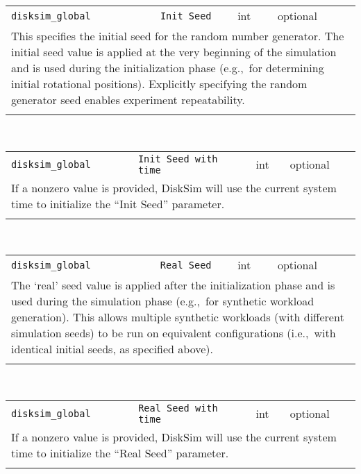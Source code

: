 \noindent 
\begin{tabular}{|p{\lpmodwidth}|p{\lpnamewidth}|p{0.5in}|p{0.5in}|}
\cline{1-4}
\texttt{disksim\_global} & \texttt{Init Seed} & int & optional \\ 
\cline{1-4}
\multicolumn{4}{|p{6in}|}{
This specifies the initial seed for the random number generator.
The initial seed value is applied at the very beginning of the
simulation and is used during the initialization phase (e.g.,~for
determining initial rotational positions). Explicitly specifying the
random generator seed enables experiment repeatability.
}\\ 
\cline{1-4}
\multicolumn{4}{p{5in}}{}\\
\end{tabular}\\ 
\noindent 
\begin{tabular}{|p{\lpmodwidth}|p{\lpnamewidth}|p{0.5in}|p{0.5in}|}
\cline{1-4}
\texttt{disksim\_global} & \texttt{Init Seed with time} & int & optional \\ 
\cline{1-4}
\multicolumn{4}{|p{6in}|}{
If a nonzero value is provided, DiskSim will use the current system
time to initialize the ``Init Seed'' parameter.
}\\ 
\cline{1-4}
\multicolumn{4}{p{5in}}{}\\
\end{tabular}\\ 
\noindent 
\begin{tabular}{|p{\lpmodwidth}|p{\lpnamewidth}|p{0.5in}|p{0.5in}|}
\cline{1-4}
\texttt{disksim\_global} & \texttt{Real Seed} & int & optional \\ 
\cline{1-4}
\multicolumn{4}{|p{6in}|}{
The `real' seed value is applied after the initialization phase
and is used during the simulation phase (e.g.,~for synthetic
workload generation). This allows multiple synthetic workloads
(with different simulation seeds) to be run on equivalent
configurations (i.e.,~with identical initial seeds,
as specified above).
}\\ 
\cline{1-4}
\multicolumn{4}{p{5in}}{}\\
\end{tabular}\\ 
\noindent 
\begin{tabular}{|p{\lpmodwidth}|p{\lpnamewidth}|p{0.5in}|p{0.5in}|}
\cline{1-4}
\texttt{disksim\_global} & \texttt{Real Seed with time} & int & optional \\ 
\cline{1-4}
\multicolumn{4}{|p{6in}|}{
If a nonzero value is provided, DiskSim will use the current system
time to initialize the ``Real Seed'' parameter.
}\\ 
\cline{1-4}
\multicolumn{4}{p{5in}}{}\\
\end{tabular}\\ 
